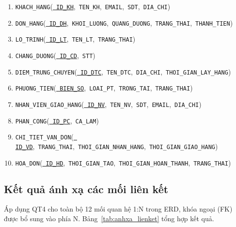 \documentclass[11pt]{report}
\begin{document}
\begin{enumerate}
    \item \texttt{KHACH\_HANG}(\underline{\texttt{\color{Emerald} ID\_KH}},\ \texttt{TEN\_KH},\ \texttt{EMAIL},\ \texttt{SDT},\ \texttt{DIA\_CHI})
    \item \texttt{DON\_HANG}(\underline{\texttt{\color{Emerald} ID\_DH}},\ \texttt{KHOI\_LUONG},\ \texttt{QUANG\_DUONG},\ \texttt{TRANG\_THAI},\ \texttt{THANH\_TIEN})
    \item \texttt{LO\_TRINH}(\underline{\texttt{\color{Emerald} ID\_LT}},\ \texttt{TEN\_LT},\ \texttt{TRANG\_THAI})
    \item \texttt{CHANG\_DUONG}(\underline{\texttt{\color{Emerald} ID\_CD}},\ \texttt{STT})
    \item \texttt{DIEM\_TRUNG\_CHUYEN}(\underline{\texttt{\color{Emerald} ID\_DTC}},\ \texttt{TEN\_DTC},\ \texttt{DIA\_CHI},\ \texttt{THOI\_GIAN\_LAY\_HANG})
    \item \texttt{PHUONG\_TIEN}(\underline{\texttt{\color{Emerald} BIEN\_SO}},\ \texttt{LOAI\_PT},\ \texttt{TRONG\_TAI},\ \texttt{TRANG\_THAI})
    \item \texttt{NHAN\_VIEN\_GIAO\_HANG}(\underline{\texttt{\color{Emerald} ID\_NV}},\ \texttt{TEN\_NV},\ \texttt{SDT},\ \texttt{EMAIL},\ \texttt{DIA\_CHI})
    \item \texttt{PHAN\_CONG}(\underline{\texttt{\color{Emerald} ID\_PC}},\ \texttt{CA\_LAM})
    \item \texttt{CHI\_TIET\_VAN\_DON}(\underline{\texttt{\color{Emerald} ID\_VD}},\ \texttt{TRANG\_THAI},\ \texttt{THOI\_GIAN\_NHAN\_HANG},\ \texttt{THOI\_GIAN\_GIAO\_HANG})
    \item \texttt{HOA\_DON}(\underline{\texttt{\color{Emerald} ID\_HD}},\ \texttt{THOI\_GIAN\_TAO},\ \texttt{THOI\_GIAN\_HOAN\_THANH},\ \texttt{TRANG\_THAI})
\end{enumerate}

\subsection{Kết quả ánh xạ các mối liên kết}
\label{subsec:anhxa_moilienket}

Áp dụng QT4 cho toàn bộ 12 mối quan hệ 1:N trong ERD, khóa ngoại (FK) được bổ sung vào phía N. Bảng~\ref{tab:anhxa_lienket} tổng hợp kết quả.
\end{document}
